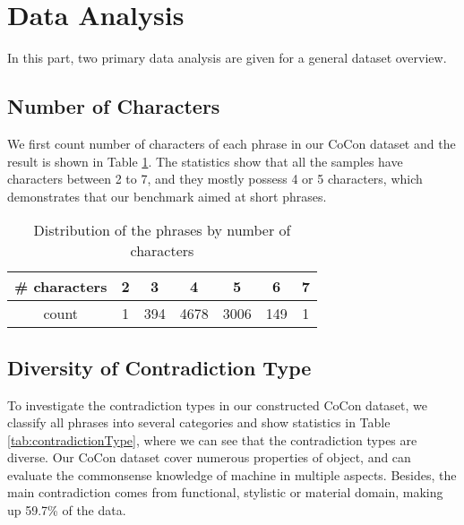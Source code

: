 \section{Data Analysis}
In this part, two primary data analysis are given for a general dataset overview. 
\subsection{Number of Characters}
We first count number of characters of each phrase in our CoCon dataset and the result is shown in Table \ref{tab:numCharCoCon}. %
The statistics show that all the samples have characters between 2 to 7, and they mostly possess 4 or 5 characters, which demonstrates that our benchmark aimed at short phrases. 

\begin{table}[h!]
	\small
	\centering
	\begin{tabular}{ccccccc}
		\hline
		\# characters &2&3&4&5&6&7 \\
		\hline
		count&1&394&4678&3006&149&1\\
		\hline
	\end{tabular}
	\caption{Distribution of the phrases by number of characters}
	\label{tab:numCharCoCon}
\end{table}


\subsection{Diversity of Contradiction Type}
To investigate the contradiction types in our constructed CoCon dataset, we classify all phrases into several categories and show statistics in Table \ref{tab:contradictionType}, %
where we can see that the contradiction types are diverse. Our CoCon dataset cover numerous properties of object, and can evaluate the commonsense knowledge of machine in multiple aspects. Besides, the main contradiction comes from functional, stylistic or material domain, making up 59.7\% of the data. 

